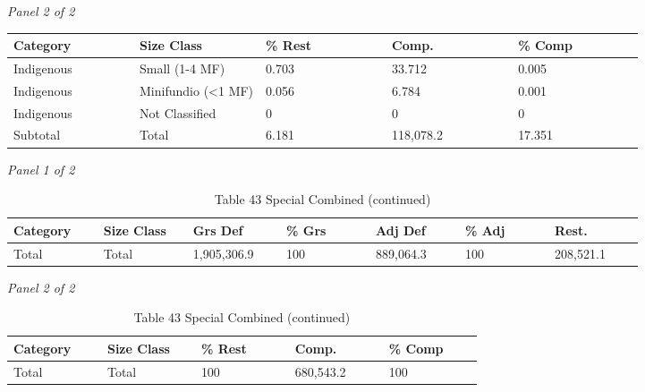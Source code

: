 \documentclass[12pt]{article}
\begin{document}
\begin{landscape}
\begin{table}[H]
\textit{Panel 2 of 2}\\[2pt]
{\fontsize{12}{14}\selectfont
\setlength{\tabcolsep}{3pt}
\renewcommand{\arraystretch}{1.08}
\begin{tabular}{p{0.164\linewidth}p{0.164\linewidth}p{0.164\linewidth}p{0.164\linewidth}p{0.164\linewidth}}
\toprule
Category & Size Class & \% Rest & Comp. & \% Comp \\
\midrule
Indigenous & Small (1-4 MF) & 0.703 & 33.712 & 0.005 \\
Indigenous & Minifundio (<1 MF) & 0.056 & 6.784 & 0.001 \\
Indigenous & Not Classified & 0 & 0 & 0 \\
Subtotal & Total & 6.181 & 118,078.2 & 17.351 \\
\bottomrule
\end{tabular}
}
\end{table}
\begin{table}[H]
\centering
\caption{Table 43 Special Combined (continued)}
\textit{Panel 1 of 2}\\[2pt]
{\fontsize{12}{14}\selectfont
\setlength{\tabcolsep}{3pt}
\renewcommand{\arraystretch}{1.08}
\begin{tabular}{p{0.117\linewidth}p{0.117\linewidth}p{0.117\linewidth}p{0.117\linewidth}p{0.117\linewidth}p{0.117\linewidth}p{0.117\linewidth}}
\toprule
Category & Size Class & Grs Def & \% Grs & Adj Def & \% Adj & Rest. \\
\midrule
Total & Total & 1,905,306.9 & 100 & 889,064.3 & 100 & 208,521.1 \\
\bottomrule
\end{tabular}
}

\vspace{0.6em}

\textit{Panel 2 of 2}\\[2pt]
{\fontsize{12}{14}\selectfont
\setlength{\tabcolsep}{3pt}
\renewcommand{\arraystretch}{1.08}
\begin{tabular}{p{0.164\linewidth}p{0.164\linewidth}p{0.164\linewidth}p{0.164\linewidth}p{0.164\linewidth}}
\toprule
Category & Size Class & \% Rest & Comp. & \% Comp \\
\midrule
Total & Total & 100 & 680,543.2 & 100 \\
\bottomrule
\end{tabular}
}
\end{table}
\end{landscape}
\end{document}
